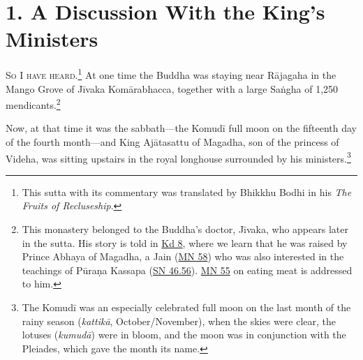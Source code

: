 \documentclass[12pt,openany]{book}%
\newcommand*{\scevam}[1]{\textsc{#1}}
\begin{document}
\section*{1. A Discussion With the King’s Ministers }

\scevam{So I have heard.\footnote{This sutta with its commentary was translated by Bhikkhu Bodhi in his \emph{The Fruits of Recluseship}. } }At one time the Buddha was staying near \textsanskrit{Rājagaha} in the Mango Grove of \textsanskrit{Jīvaka} \textsanskrit{Komārabhacca}, together with a large \textsanskrit{Saṅgha} of 1,250 mendicants.\footnote{This monastery belonged to the Buddha’s doctor, \textsanskrit{Jīvaka}, who appears later in the sutta. His story is told in \href{https://suttacentral.net/pli-tv-kd8/en/sujato}{Kd 8}, where we learn that he was raised by Prince Abhaya of Magadha, a Jain (\href{https://suttacentral.net/mn58/en/sujato}{MN 58}) who was also interested in the teachings of  \textsanskrit{Pūraṇa} Kassapa (\href{https://suttacentral.net/sn46.56/en/sujato}{SN 46.56}). \href{https://suttacentral.net/mn55/en/sujato}{MN 55} on eating meat is addressed to him. } 

Now, at that time it was the sabbath—the \textsanskrit{Komudī} full moon on the fifteenth day of the fourth month—and King \textsanskrit{Ajātasattu} of Magadha, son of the princess of Videha, was sitting upstairs in the royal longhouse surrounded by his ministers.\footnote{The \textsanskrit{Komudī} was an especially celebrated full moon on the last month of the rainy season (\textit{\textsanskrit{kattikā}}, October/November), when the skies were clear, the lotuses (\textit{\textsanskrit{kumudā}}) were in bloom, and the moon was in conjunction with the Pleiades, which gave the month its name. } 
\end{document}
